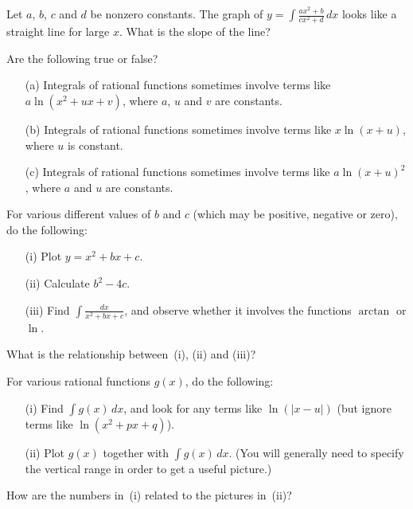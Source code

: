 \documentclass[a4paper,10pt]{amsbook}
\numberwithin{example}{chapter}
\begin{document}
\begin{exercise}
 Let $a$, $b$, $c$ and $d$ be nonzero constants.  The graph
 of $\displaystyle y=\int\frac{ax^2+b}{cx^2+d}\,dx$ looks
 like a straight line for large $x$.  What is the slope of
 the line?
\end{exercise}

\begin{exercise}
 Are the following true or false?
 \begin{itemize}
  \item[(a)] Integrals of rational functions sometimes
   involve terms like $a\ln(x^2+ux+v)$, where $a$, $u$ and
   $v$ are constants.
  \item[(b)] Integrals of rational functions sometimes
   involve terms like $x\ln(x+u)$, where $u$ is constant.
  \item[(c)] Integrals of rational functions sometimes
   involve terms like $a\ln(x+u)^2$, where $a$ and $u$ are
   constants. 
 \end{itemize}
\end{exercise}

\begin{exercise}
 For various different values of $b$ and $c$ (which may be
 positive, negative or zero), do the following:
 \begin{itemize}
  \item[(i)] Plot $y=x^2+bx+c$.
  \item[(ii)] Calculate $b^2-4c$.
  \item[(iii)] Find $\displaystyle\int\frac{dx}{x^2+bx+c}$,
   and observe whether it involves the functions $\arctan$
   or $\ln$. 
 \end{itemize}
 What is the relationship between~(i), (ii) and (iii)?
\end{exercise}

\begin{exercise}
 For various rational functions $g(x)$, do the following:
 \begin{itemize}
  \item[(i)] Find $\int g(x)\,dx$, and look for any terms
   like $\ln(|x-u|)$ (but ignore terms like $\ln(x^2+px+q)$).
  \item[(ii)] Plot $g(x)$ together with $\int g(x)\,dx$.
   (You will generally need to specify the vertical range in
   order to get a useful picture.)
 \end{itemize}
 How are the numbers in~(i) related to the pictures in~(ii)?  
\end{exercise}
\end{document}
